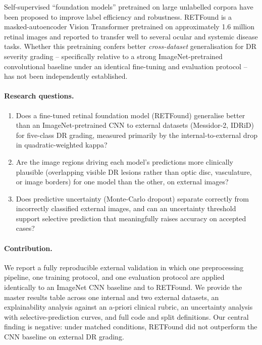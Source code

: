 \documentclass[11pt,a4paper]{article}
\begin{document}
Self-supervised ``foundation models'' pretrained on large unlabelled corpora
have been proposed to improve label efficiency and robustness. RETFound
\citep{zhou2023retfound} is a masked-autoencoder Vision Transformer pretrained
on approximately 1.6 million retinal images and reported to transfer well to
several ocular and systemic disease tasks. Whether this pretraining confers
better \emph{cross-dataset} generalisation for DR severity grading --
specifically relative to a strong ImageNet-pretrained convolutional baseline
under an identical fine-tuning and evaluation protocol -- has not been
independently established.

\paragraph{Research questions.}
\begin{enumerate}
  \item[\textbf{RQ1 (Performance).}] Does a fine-tuned retinal foundation model
    (RETFound) generalise better than an ImageNet-pretrained CNN to external
    datasets (Messidor-2, IDRiD) for five-class DR grading, measured primarily
    by the internal-to-external drop in quadratic-weighted kappa?
  \item[\textbf{RQ2 (Explainability).}] Are the image regions driving each
    model's predictions more clinically plausible (overlapping visible DR
    lesions rather than optic disc, vasculature, or image borders) for one
    model than the other, on external images?
  \item[\textbf{RQ3 (Uncertainty).}] Does predictive uncertainty (Monte-Carlo
    dropout) separate correctly from incorrectly classified external images,
    and can an uncertainty threshold support selective prediction that
    meaningfully raises accuracy on accepted cases?
\end{enumerate}

\paragraph{Contribution.} We report a fully reproducible external validation in
which one preprocessing pipeline, one training protocol, and one evaluation
protocol are applied identically to an ImageNet CNN baseline and to RETFound. We
provide the master results table across one internal and two external datasets,
an explainability analysis against an a-priori clinical rubric, an uncertainty
analysis with selective-prediction curves, and full code and split definitions.
Our central finding is negative: under matched conditions, RETFound did not
outperform the CNN baseline on external DR grading.
\end{document}
